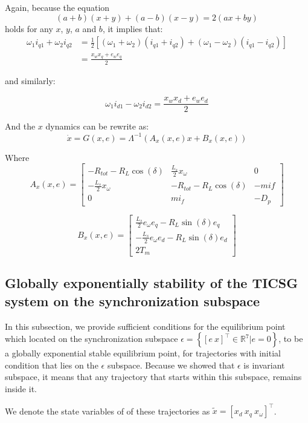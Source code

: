 \documentclass[conference]{IEEEtran}
\begin{document}
Again, because the  equation  
$$
(a+b)(x+y)+(a-b)(x-y)=2(ax+by)
$$
holds for any $x$, $y$, $a$ and $b$, it implies that:
$$
\begin{aligned}
\omega_{1}i_{q1}+\omega_{2}i_{q2} &=\frac{1}{2}\left[(\omega_{1}+\omega_{2})(i_{q1}+i_{q2})+(\omega_{1}-\omega_{2})(i_{q1}-i_{q2})\right]\\ & =\frac{x_{w}x_{q}+e_{w}e_{q}}{2}
\end{aligned}
$$

and similarly:

$$
\omega_{1}i_{d1}-\omega_{2}i_{d2}=\frac{x_{w}x_{d}+e_{w}e_{d}}{2}
$$ 

And the $x$ dynamics can be rewrite as:
$$ \dot{x}=G \left( x,e\right)= \Lambda^{-1}\left(A_x \left(x,e \right) x + B_x \left( x,e\right) \right) $$

Where
$$
A_x \left(x,e \right)=\left[\begin{array}{ccc}
-R_{tot}-R_{L}\cos(\delta) & \frac{L_{s}}{2}x_{\omega} & 0\\
-\frac{L_{s}}{2}x_{\omega} & -R_{tot}-R_{L}\cos(\delta) & -mif\\
0 & mi_{f} & -D_{p}
\end{array}\right]
$$

$$
B_x \left(x,e \right)=\left[\begin{array}{c}
\frac{L_{s}}{2}e_{\omega}e_{q}-R_{L}\sin(\delta)e_{q}\\
-\frac{L_{s}}{2}e_{\omega}e_{d}-R_{L}\sin(\delta)e_{d}\\
2T_{m}
\end{array}\right]
$$

\subsection{Globally exponentially stability of the TICSG system on the synchronization subspace }

In this subsection, we provide sufficient conditions for the equilibrium
point which located on the synchronization subspace $\epsilon=\left\{ \left[ e\ x \right]^\top \in\mathbb{R}^{7}|e=0\right\} $,  to be a globally exponential stable equilibrium point, for trajectories with initial condition that lies on the $\epsilon$ subspace.  Because we showed that  $\epsilon$ is invariant subspace, it means that any trajectory that starts within this subspace, remains inside it.

We denote the state variables of of these trajectories as $\tilde{x} = \left[x_d \ x_q\ x_\omega \right]^\top$. 
\end{document}
